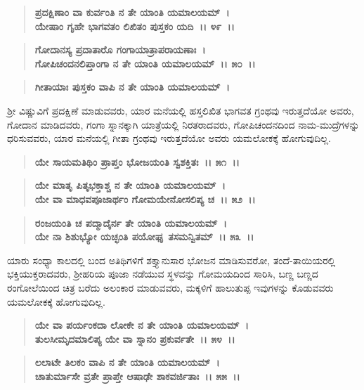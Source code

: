 \begin{verse}
\textbf{ಪ್ರದಕ್ಷಿಣಾಂ ವಾ ಕುರ್ವಂತಿ ನ ತೇ ಯಾಂತಿ ಯಮಾಲಯಮ್~।}\\\textbf{ಯೇಷಾಂ ಗೃಹೇ ಭಾಗವತಂ ಲಿಖಿತಂ ಪುಸ್ತಕಂ ಯದಿ~।। ೪೯~।। }
\end{verse}

\begin{verse}
\textbf{ಗೋದಾನಸ್ಯ ಪ್ರದಾತಾರೊ ಗಂಗಾಯಾತ್ರಾಪರಾಯಣಾಃ~।}\\\textbf{ಗೋಪಿಚಂದನಲಿಪ್ತಾಂಗಾ ನ ತೇ ಯಾಂತಿ ಯಮಾಲಯಮ್~।। ೫೦~।। }
\end{verse}

\begin{verse}
\textbf{ಗೀತಾಯಾಃ ಪುಸ್ತಕಂ ವಾಪಿ ನ ತೇ ಯಾಂತಿ ಯಮಾಲಯಮ್~।}
\end{verse}

ಶ‍್ರೀ ವಿಷ್ಣುವಿಗೆ ಪ್ರದಕ್ಷಿಣೆ ಮಾಡುವವರು, ಯಾರ ಮನೆಯಲ್ಲಿ ಹಸ್ತಲಿಖಿತ ಭಾಗವತ ಗ್ರಂಥವು ಇರುತ್ತದೆಯೋ ಅವರು, ಗೋದಾನ ಮಾಡಿದವರು, ಗಂಗಾ ಸ್ನಾನಕ್ಕಾಗಿ ಯಾತ್ರೆಯಲ್ಲಿ ನಿರತರಾದವರು, ಗೋಪಿಚಂದನದಿಂದ ನಾಮ-ಮುದ್ರೆಗಳನ್ನು ಧರಿಸುವವರು, ಯಾರ ಮನೆಯಲ್ಲಿ ಗೀತಾ ಗ್ರಂಥವು ಇರುತ್ತದೆಯೋ ಅವರು ಯಮಲೋಕಕ್ಕೆ ಹೋಗುವುದಿಲ್ಲ.

\begin{verse}
\textbf{ಯೇ ಸಾಯಮತಿಥಿಂ ಪ್ರಾಪ್ತಂ ಭೋಜಯಂತಿ ಸ್ವಶಕ್ತಿತಃ~।। ೫೧~।।} 
\end{verse}

\begin{verse}
\textbf{ಯೇ ಮಾತೃ ಪಿತೃಭಕ್ತಾಶ್ಚ ನ ತೇ ಯಾಂತಿ ಯಮಾಲಯಮ್~।}\\\textbf{ಯೇ ವಾ ಮಾಧವಪೂಜಾರ್ಥಂ ಗೋಮಯೇನೋಸಲಿಪ್ಯ ಚ~।। ೫೨~।। }
\end{verse}

\begin{verse}
\textbf{ರಂಜಯಂತಿ ಚ ಪದ್ಮಾದೈರ್ನ ತೇ ಯಾಂತಿ ಯಮಾಲಯಮ್~।}\\\textbf{ಯೇ ನಾ ಶಿಶುಭ್ಯೋ ಯಚ್ಛಂತಿ ಪಯೋಘೃ ತಸಮನ್ವಿತಮ್~।। ೫೩~।।}
\end{verse}

ಯಾರು ಸಂಧ್ಯಾ ಕಾಲದಲ್ಲಿ ಬಂದ ಅತಿಥಿಗಳಿಗೆ ಶಕ್ತ್ಯಾನುಸಾರ ಭೋಜನ ಮಾಡಿಸುವರೋ, ತಂದೆ-ತಾಯಿಯರಲ್ಲಿ ಭಕ್ತಿಯುಕ್ತರಾದವರು, ಶ‍್ರೀಹರಿಯ ಪೂಜಾ ನಡೆಯುವ ಸ್ಥಳವನ್ನು ಗೋಮಯದಿಂದ ಸಾರಿಸಿ, ಬಣ್ಣ ಬಣ್ಣದ ರಂಗೋಲೆಯಿಂದ ಚಿತ್ರ ಬರೆದು ಅಲಂಕಾರ ಮಾಡುವವರು, ಮಕ್ಕಳಿಗೆ ಹಾಲುತುಪ್ಪ ಇವುಗಳನ್ನು ಕೊಡುವವರು ಯಮಲೋಕಕ್ಕೆ ಹೋಗುವುದಿಲ್ಲ.

\begin{verse}
\textbf{ಯೇ ವಾ ಪರ್ಯಂಕದಾ ಲೋಕೇ ನ ತೇ ಯಾಂತಿ ಯಮಾಲಯಮ್~।}\\\textbf{ತುಲಸೀಮೃದಮಾಲಿಪ್ಯ ಯೇ ವಾ ಸ್ನಾನಂ ಪ್ರಕುರ್ವತೇ~।। ೫೪~।। }
\end{verse}

\begin{verse}
\textbf{ಲಲಾಟೇ ತಿಲಕಂ ವಾಪಿ ನ ತೇ ಯಾಂತಿ ಯಮಾಲಯಮ್~।}\\\textbf{ಚಾತುರ್ಮಾಸೇ ವ್ರತೇ ಪ್ರಾಪ್ತೇ ಆಷಾಢೇ ಶಾಕವರ್ಜಿತಾಃ~।। ೫೫~।।} 
\end{verse}

